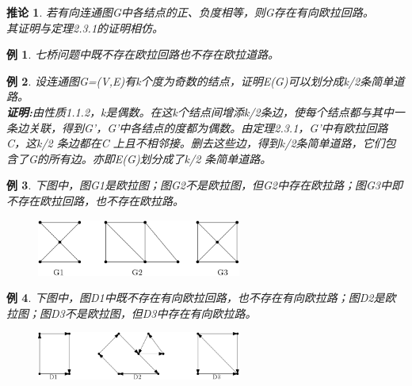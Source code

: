 \documentclass[11pt,a4paper,openany]{book}
\newtheorem{coro}{\textbf{推论}}[section]
\newtheorem{sample}{\textbf{例}}[section]
\begin{document}
\begin{coro}
若有向连通图G中各结点的正、负度相等，则G存在有向欧拉回路。\\
其证明与定理2.3.1的证明相仿。
\end{coro}
\begin{sample}
七桥问题中既不存在欧拉回路也不存在欧拉道路。
\end{sample}
\begin{sample}
 设连通图G=(V,E)有k个度为奇数的结点，证明E(G)可以划分成k/2条简单道路。\\
 \textbf{证明:}由性质1.1.2，k是偶数。在这k个结点间增添k/2条边，使每个结点都与其中一条边关联，得到G'，G'中各结点的度都为偶数。由定理2.3.1，G'中有欧拉回路C，这k/2 条边都在C 上且不相邻接。删去这些边，得到k/2条简单道路，它们包含了G的所有边。亦即E(G)划分成了k/2 条简单道路。
 \end{sample}
\begin{sample}
下图中，图G1是欧拉图；图G2不是欧拉图，但G2中存在欧拉路；图G3中即不存在欧拉回路，也不存在欧拉路。\\
\begin{figure}[h]
  \centering
  \includegraphics[width=0.6\textwidth]{2.f1.png}\\
  \caption*{}
\end{figure}
\end{sample}
\begin{sample}
下图中，图D1中既不存在有向欧拉回路，也不存在有向欧拉路；图D2是欧拉图；图D3不是欧拉图，但D3中存在有向欧拉路。
\begin{figure}[h]
  \centering
  \includegraphics[width=0.6\textwidth]{2.f2.png}\\
  \caption*{}
\end{figure}
\end{sample}
\end{document}
